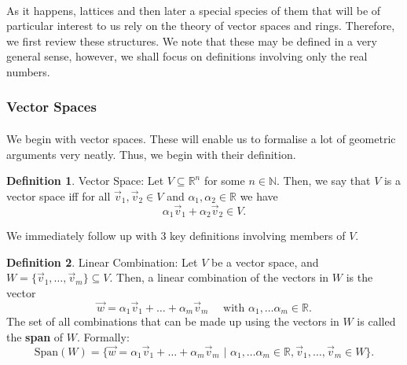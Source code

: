 \documentclass{article}
\theoremstyle{definition}
\newtheorem{definition}{Definition}[section]
\newcommand{\Nat}{\mathbb{N}}
\newcommand{\Reals}{\mathbb{R}}
\newcommand{\Span}{\text{Span}}
\begin{document}
\paragraph{} As it happens, lattices and then later a special species of them
that will be of particular interest to us rely on the theory of vector
spaces and rings. Therefore, we first review these structures. We note that
these may be defined in a very general sense, however, we shall focus on
definitions involving only the real numbers.
\subsubsection{Vector Spaces}
\paragraph{} We begin with vector spaces. These will enable us to formalise a
lot of geometric arguments very neatly. Thus, we begin with their definition.
\begin{definition}{Vector Space:}
  Let $V \subseteq \Reals^n$ for some $n \in \Nat$. Then, we say that $V$ is a
  vector space iff for all $\vec{v}_1, \vec{v}_2 \in V$ and $\alpha_1, \alpha_2
  \in \Reals$ we have
  \[
    \alpha_1\vec{v}_1 + \alpha_2\vec{v}_2 \in V.
  \]
\end{definition}
We immediately follow up with 3 key definitions involving members of $V$.
\begin{definition}{Linear Combination:}
  Let $V$ be a vector space, and $W = \{\vec{v}_1, \hdots, \vec{v}_m\} \subseteq
  V$. Then, a linear combination of the vectors in $W$ is the vector
  \[
    \vec{w} = \alpha_1\vec{v}_1 + \hdots + \alpha_m\vec{v}_m\quad\text{ with }
    \alpha_1, \hdots \alpha_m \in \Reals.
  \]
  The set of all combinations that can be made up using the vectors in $W$ is
  called the \textbf{span} of $W$. Formally:
  \[
    \Span(W) = \{\vec{w} = \alpha_1\vec{v}_1 + \hdots + \alpha_m\vec{v}_m
    \,\,|\,\, \alpha_1, \hdots \alpha_m \in \Reals, \vec{v}_1,\hdots, \vec{v}_m
    \in W \}.
  \]
\end{definition}
\end{document}
